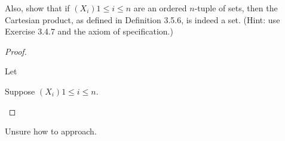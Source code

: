 \documentclass[../../main.tex]{subfiles}
\begin{document}
\begin{q}
    Also, show that if $(X_i){1 \leq i \leq n}$ are an ordered $n$-tuple of sets, then the Cartesian product, as defined in Definition 3.5.6, is indeed a set. (Hint: use Exercise 3.4.7 and the axiom of specification.)
\end{q}

\begin{proof}
\begin{linebyline}
    \item Let 
    \item Suppose $(X_i){1 \leq i \leq n}$.
    \begin{linebyline}
        \item
    \end{linebyline}
\end{linebyline}
\end{proof}
\begin{xx}
    Unsure how to approach.
\end{xx}

\addtocounter{subsection}{1}
\end{document}
